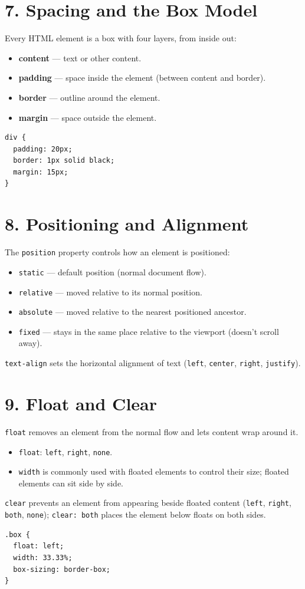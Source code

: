 \documentclass[12pt]{article}
\begin{document}
\section{7. Spacing and the Box Model}
Every HTML element is a box with four layers, from inside out:
\begin{itemize}
    \item \textbf{content} — text or other content.
    \item \textbf{padding} — space inside the element (between content and border).
    \item \textbf{border} — outline around the element.
    \item \textbf{margin} — space outside the element.
\end{itemize}
\begin{lstlisting}
div {
  padding: 20px;
  border: 1px solid black;
  margin: 15px;
}
\end{lstlisting}

\section{8. Positioning and Alignment}
The \texttt{position} property controls how an element is positioned:
\begin{itemize}
    \item \texttt{static} — default position (normal document flow).
    \item \texttt{relative} — moved relative to its normal position.
    \item \texttt{absolute} — moved relative to the nearest positioned ancestor.
    \item \texttt{fixed} — stays in the same place relative to the viewport (doesn't scroll away).
\end{itemize}
\texttt{text-align} sets the horizontal alignment of text (\texttt{left}, \texttt{center}, \texttt{right}, \texttt{justify}).

\section{9. Float and Clear}
\texttt{float} removes an element from the normal flow and lets content wrap around it.
\begin{itemize}
    \item \texttt{float}: \texttt{left}, \texttt{right}, \texttt{none}.
    \item \texttt{width} is commonly used with floated elements to control their size; floated elements can sit side by side.
\end{itemize}
\texttt{clear} prevents an element from appearing beside floated content (\texttt{left}, \texttt{right}, \texttt{both}, \texttt{none}); \texttt{clear: both} places the element below floats on both sides.
\begin{lstlisting}
.box {
  float: left;
  width: 33.33%;
  box-sizing: border-box;
}
\end{lstlisting}
\end{document}
